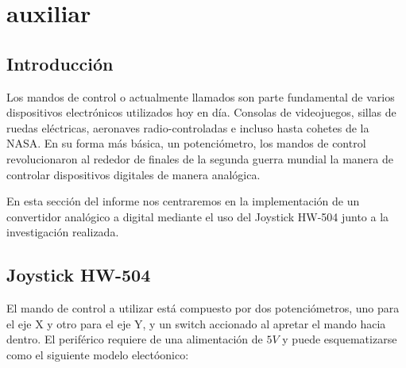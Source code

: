 

\section{auxiliar}
\tableofcontents

\subsection{Introducción}

Los mandos de control o actualmente llamados  son parte fundamental de varios dispositivos electrónicos utilizados hoy en día. Consolas de videojuegos, sillas de ruedas eléctricas, aeronaves radio-controladas e incluso hasta cohetes de la NASA. En su forma más básica, un potenciómetro, los mandos de control revolucionaron al rededor de finales de la segunda guerra mundial la manera de controlar dispositivos digitales de manera analógica. 

En esta sección del informe nos centraremos en la implementación de un convertidor analógico a digital mediante el uso del Joystick HW-504 junto a la investigación realizada.

\subsection{Joystick HW-504}

El mando de control a utilizar está compuesto por dos potenciómetros, uno para el eje X y otro para el eje Y, y un switch accionado al apretar el mando hacia dentro. El periférico requiere de una alimentación de $5V$ y puede esquematizarse como el siguiente modelo electóonico:

